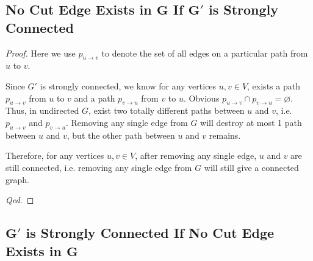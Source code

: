 \documentclass{article}
\begin{document}
\subsection{No Cut Edge Exists in $\boldsymbol{G}$ If $\boldsymbol{G}'$ is Strongly Connected}
\vspace{1em}
\begin{proof}
    Here we use $p_{u\rightarrow v}$ to denote the set of all edges on a particular path from $u$ to $v$.

    \hspace{1.3em}
    Since $G'$ is strongly connected, we know for any vertices $u,v\in V$, exists a path $p_{u\rightarrow v}$ from $u$ to $v$ and a path $p_{v\rightarrow u}$ from $v$ to $u$. Obvious $p_{u\rightarrow v}\cap p_{v\rightarrow u}=\varnothing$. Thus, in undirected $G$, exist two totally different paths between $u$ and $v$, i.e. $p_{u\rightarrow v}$ and $p_{v\rightarrow u}$. Removing any single edge from $G$ will destroy at most 1 path between $u$ and $v$, but the other path between $u$ and $v$ remains.
    
    \hspace{1.3em}
    Therefore, for any vertices $u,v\in V$, after removing any single edge, $u$ and $v$ are still connected, i.e. 
    removing any single edge from $G$ will still give a connected graph.
    
    \hspace{38.75em}
    \textit{Qed.}
\end{proof}

\vspace{5em}
\subsection{$\boldsymbol{G}'$ is Strongly Connected If No Cut Edge Exists in $\boldsymbol{G}$}
\vspace{1em}
\end{document}
